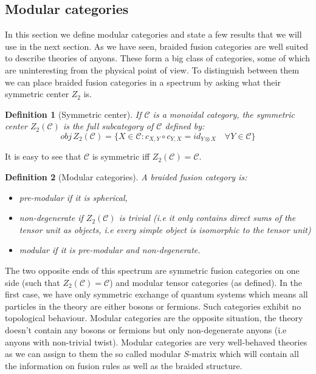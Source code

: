 \documentclass{article}
\newtheorem{definition}{Definition}
\newcommand{\cat}{\mathcal{C}}
\begin{document}
\subsection{Modular categories}
In this section we  define modular categories and state a few results that we will use in the next section. As we have seen, braided fusion categories are well suited to describe theories of anyons. These form a big class of categories, some of which are uninteresting from the physical point of view. To distinguish between them we can place braided fusion categories in a spectrum by asking what their symmetric center $Z_2$ is. 

\begin{definition}[Symmetric center]
	If $\cat$ is a monoidal category, the symmetric center $Z_2(\mathcal{C})$ is the full subcategory of $\mathcal{C}$ defined by:
	$$ obj \, Z_2(\mathcal{C}) = \{ X\in \mathcal{C} : c_{X,Y} \circ c_{Y,X} = id_{Y\otimes X} \quad \forall Y \in \mathcal{C} \} $$
\end{definition}
It is easy to see that $\cat$ is symmetric iff $Z_2(\cat)=\cat$.
\begin{definition}[Modular categories]
	A braided fusion category is:
	\begin{itemize}
		\item pre-modular if it is spherical,
		\item non-degenerate if $Z_2(\mathcal{C})$ is trivial (i.e it only contains direct sums of the tensor unit as objects, i.e every simple object is isomorphic to the tensor unit)
		\item modular if it is pre-modular and non-degenerate.
	\end{itemize}
\end{definition}
The two opposite ends of this spectrum are symmetric fusion categories on one side (such that $Z_2(\mathcal{C})=\mathcal{C}$) and modular tensor categories (as defined). 
In the first case, we have only symmetric exchange of quantum systems which means all particles in the theory are either bosons or fermions. Such categories exhibit no topological behaviour. Modular categories are the opposite situation, the theory doesn't contain any bosons or fermions but only non-degenerate anyons (i.e anyons with non-trivial twist). Modular categories are very well-behaved theories as we can assign to them the so called modular $S$-matrix which will contain all the information on fusion rules as well as the braided structure.
\end{document}
